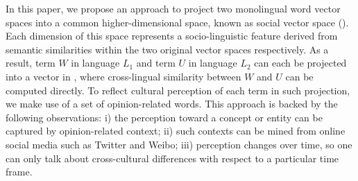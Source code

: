 %
%
In this paper, we propose an approach to project 
two monolingual word vector spaces into 
a common higher-dimensional space, known as social vector space (\textit{\socvec}).
Each dimension of this space represents a socio-linguistic feature derived from semantic similarities within the two original vector spaces respectively. 
As a result, term $W$ in language $L_1$ and term $U$ in language $L_2$ can each be projected 
into a vector in \textit{\socvec}, where cross-lingual similarity between $W$ and $U$ can be 
computed directly. 
To reflect cultural perception of each term in such projection,
we make use of a set of opinion-related words.
This approach is backed by the following observations: i) the perception toward a concept or entity
can be captured by opinion-related context; ii) such contexts can be mined from
online social media such as Twitter and Weibo; iii) perception changes over time, so one can only
talk about cross-cultural differences with respect to a 
particular time frame. 

